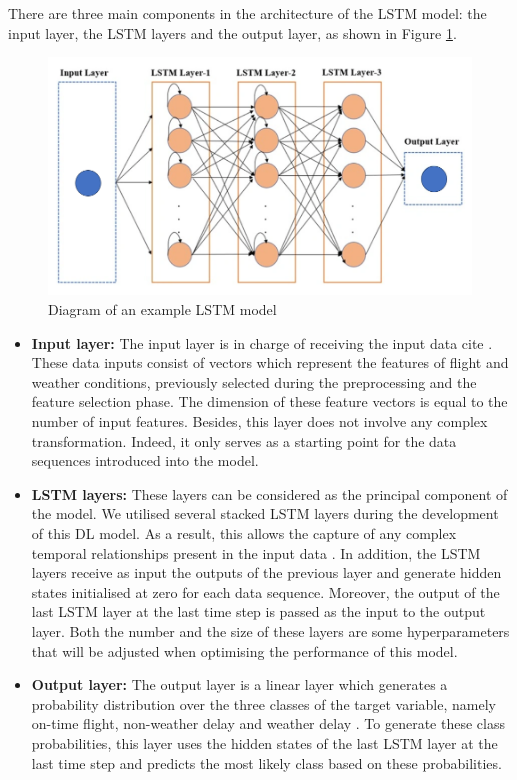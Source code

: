 \documentclass[12pt,oneside]{book} %
\begin{document}
\noindent There are three main components in the architecture of the LSTM model: the input layer, the LSTM layers and the output layer, as shown in Figure \ref{fig:LSTM_model}.

\begin{figure}[H]
    \centering
    \includegraphics[width=0.9\linewidth]{Image/LSTM.png}
    \caption{\centering Diagram of an example LSTM model}
    \label{fig:LSTM_model}
\end{figure}

\begin{itemize}
    \item \textbf{Input layer:} The input layer is in charge of receiving the input data cite \cite{NN_structure}. These data inputs consist of vectors which represent the features of flight and weather conditions, previously selected during the preprocessing and the feature selection phase. The dimension of these feature vectors is equal to the number of input features. Besides, this layer does not involve any complex transformation. Indeed, it only serves as a starting point for the data sequences introduced into the model.
    \item \textbf{LSTM layers:} These layers can be considered as the principal component of the model. We utilised several stacked LSTM layers during the development of this DL model. As a result, this allows the capture of any complex temporal relationships present in the input data \cite{NN_structure}. In addition, the LSTM layers receive as input the outputs of the previous layer \cite{NN_structure} and generate hidden states initialised at zero for each data sequence. Moreover, the output of the last LSTM layer at the last time step is passed as the input to the output layer. Both the number and the size of these layers are some hyperparameters that will be adjusted when optimising the performance of this model.
    \item \textbf{Output layer:} The output layer is a linear layer which generates a probability distribution over the three classes of the target variable, namely on-time flight, non-weather delay and weather delay \cite{NN_structure}. To generate these class probabilities, this layer uses the hidden states of the last LSTM layer at the last time step and predicts the most likely class based on these probabilities.
\end{itemize}
\end{document}
